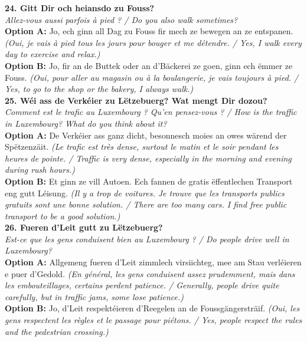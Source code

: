 \noindent\textbf{24. Gitt Dir och heiansdo zu Fouss?}\\
\textit{Allez-vous aussi parfois à pied ? / Do you also walk sometimes?}\\
\textbf{Option A:} Jo, ech ginn all Dag zu Fouss fir mech ze bewegen an ze entspanen. \textit{(Oui, je vais à pied tous les jours pour bouger et me détendre. / Yes, I walk every day to exercise and relax.)}\\
\textbf{Option B:} Jo, fir an de Buttek oder an d'Bäckerei ze goen, ginn ech ëmmer ze Fouss. \textit{(Oui, pour aller au magasin ou à la boulangerie, je vais toujours à pied. / Yes, to go to the shop or the bakery, I always walk.)}\\[1em]

\noindent\textbf{25. Wéi ass de Verkéier zu Lëtzebuerg? Wat mengt Dir dozou?}\\
\textit{Comment est le trafic au Luxembourg ? Qu'en pensez-vous ? / How is the traffic in Luxembourg? What do you think about it?}\\
\textbf{Option A:} De Verkéier ass ganz dicht, besonnesch moies an owes wärend der Spëtzenzäit. \textit{(Le trafic est très dense, surtout le matin et le soir pendant les heures de pointe. / Traffic is very dense, especially in the morning and evening during rush hours.)}\\
\textbf{Option B:} Et ginn ze vill Autoen. Ech fannen de gratis ëffentlechen Transport eng gutt Léisung. \textit{(Il y a trop de voitures. Je trouve que les transports publics gratuits sont une bonne solution. / There are too many cars. I find free public transport to be a good solution.)}\\[1em]

\noindent\textbf{26. Fueren d’Leit gutt zu Lëtzebuerg?}\\
\textit{Est-ce que les gens conduisent bien au Luxembourg ? / Do people drive well in Luxembourg?}\\
\textbf{Option A:} Allgemeng fueren d'Leit zimmlech virsiichteg, mee am Stau verléieren e puer d'Gedold. \textit{(En général, les gens conduisent assez prudemment, mais dans les embouteillages, certains perdent patience. / Generally, people drive quite carefully, but in traffic jams, some lose patience.)}\\
\textbf{Option B:} Jo, d'Leit respektéieren d'Reegelen an de Foussgängersträif. \textit{(Oui, les gens respectent les règles et le passage pour piétons. / Yes, people respect the rules and the pedestrian crossing.)}\\[1em]


